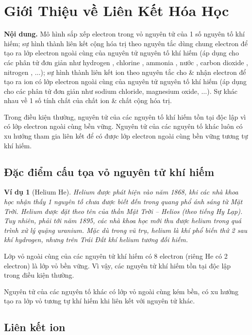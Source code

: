 \documentclass{article}
\newtheorem{vidu}{Ví dụ}
\begin{document}

\section{Giới Thiệu về Liên Kết Hóa Học}
\textsf{\textbf{Nội dung.} Mô hình sắp xếp electron trong vỏ nguyên tử của 1 số nguyên tố khí hiếm; sự hình thành liên kết cộng hóa trị theo nguyên tắc dùng chung electron để tạo ra lớp electron ngoài cùng của nguyên tử nguyên tố khí hiếm (áp dụng cho các phân tử đơn giản như hydrogen , chlorine , ammonia , nước , carbon dioxide , nitrogen , $\ldots$); sự hình thành liên kết ion theo nguyên tắc cho \& nhận electron để tạo ra ion có lớp electron ngoài cùng của nguyên tử nguyên tố khí hiếm (áp dụng cho các phân tử đơn giản như sodium chloride, magnesium oxide, $\ldots$). Sự khác nhau về 1 số tính chất của chất ion \& chất cộng hóa trị.}

Trong điều kiện thường, nguyên tử của các nguyên tố khí hiếm tồn tại độc lập vì có lớp electron ngoài cùng bền vững. Nguyên tử của các nguyên tố khác luôn có xu hướng tham gia liên kết để có được lớp electron ngoài cùng bền vững tương tự khí hiếm.

\subsection{Đặc điểm cấu tọa vỏ nguyên tử khí hiếm}

\begin{vidu}[Helium He]
	Helium được phát hiện vào năm 1868, khi các nhà khoa học nhận thấy 1 nguyên tố chưa được biết đến trong quang phổ ánh sáng từ Mặt Trời. Helium được đặt theo tên của thần Mặt Trời -- Helios (theo tiếng Hy Lạp). Tuy nhiên, phải tới năm 1895, các nhà khoa học mới thu được helium trong quá trình xử lý quặng uranium. Mặc dù trong vũ trụ, helium là khí phổ biến thứ 2 sau khí hydrogen, nhưng trên Trái Đất khí helium tương đối hiếm.
\end{vidu}
Lớp vỏ ngoài cùng của các nguyên tử khí hiếm có 8 electron (riêng He có 2 electron) là lớp vỏ bền vững. Vì vậy, các nguyên tử khí hiếm tồn tại độc lập trong điều kiện thường.

Nguyên tử của các nguyên tố khác có lớp vỏ ngoài cùng kém bền, có xu hướng tạo ra lớp vỏ tương tự khí hiếm khi liên kết với nguyên tử khác.

\subsection{Liên kết ion}
\end{document}
